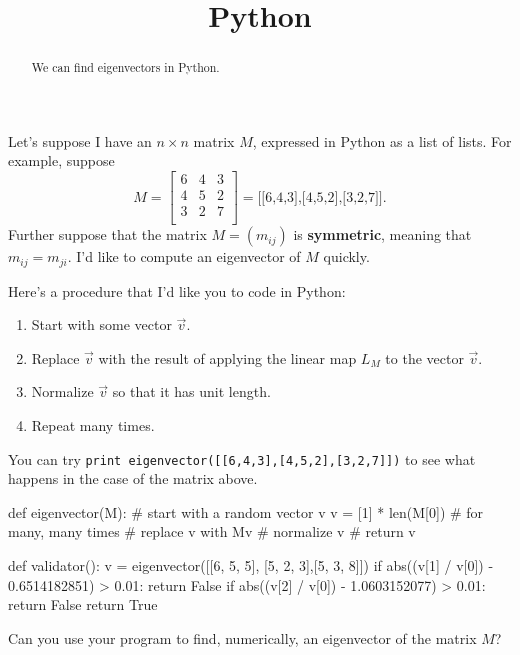 \documentclass{ximera}
\title{Python}
\begin{document}
\begin{abstract}
  We can find eigenvectors in Python.
\end{abstract}

Let's suppose I have an $n \times n$ matrix $M$, expressed in Python as a list of lists.  For example, suppose
$$
M = \begin{bmatrix}
6 & 4 & 3 \\
4 & 5 & 2 \\
3 & 2 & 7 \\
\end{bmatrix} = \text{[[6,4,3],[4,5,2],[3,2,7]]}.
$$
Further suppose that the matrix $M = (m_{ij})$ is \textbf{symmetric},
meaning that $m_{ij} = m_{ji}$.  I'd like to compute an eigenvector of
$M$ quickly.

\begin{question}
  Here's a procedure that I'd like you to code in Python:
  \begin{enumerate}
  \item Start with some vector $\vec{v}$.
  \item Replace $\vec{v}$ with the result of applying the linear map $L_M$ to the vector $\vec{v}$.
  \item Normalize $\vec{v}$ so that it has unit length.
  \item Repeat many times.
  \end{enumerate}

  You can try \texttt{print eigenvector([[6,4,3],[4,5,2],[3,2,7]])} to
  see what happens in the case of the matrix above.

  \begin{solution}
    \begin{python}
def eigenvector(M):
  # start with a random vector v
  v = [1] * len(M[0])
  # for many, many times
  #   replace v with Mv
  #   normalize v
  # return v 

def validator():
  v = eigenvector([[6, 5, 5], [5, 2, 3],[5, 3, 8]])
  if abs((v[1] / v[0]) - 0.6514182851) > 0.01:
    return False
  if abs((v[2] / v[0]) - 1.0603152077) > 0.01:
    return False
  return True
    \end{python}
  \end{solution}

Can you use your program to find, numerically, an eigenvector of the matrix $M$?

\end{question}
\end{document}
